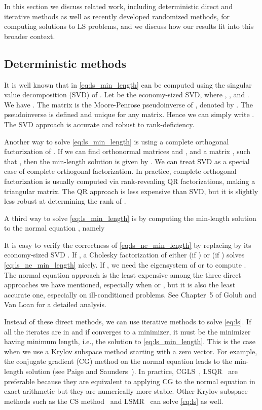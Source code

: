 \documentclass{siamltex}
\begin{document}
In this section we discuss related work, including deterministic direct and
iterative methods as well as recently developed randomized methods, for
computing solutions to LS problems, and we discuss how our results fit into this
broader context.

\subsection{Deterministic methods}
\label{sec:deter-method}

It is well known that  in \eqref{eq:ls_min_length} can be computed using
the singular value decomposition (SVD) of . Let  be the
economy-sized SVD, where , , and . We have .  The matrix  is the Moore-Penrose
pseudoinverse of , denoted by . The pseudoinverse is defined and
unique for any matrix. Hence we can simply write . The SVD
approach is accurate and robust to rank-deficiency.

Another way to solve \eqref{eq:ls_min_length} is using a complete orthogonal
factorization of . If we can find orthonormal matrices  and , and a matrix , such that , then the min-length solution
is given by . We can treat SVD as a special case of
complete orthogonal factorization. In practice, complete orthogonal
factorization is usually computed via rank-revealing QR factorizations, making
 a triangular matrix. The QR approach is less expensive than SVD, but it is
slightly less robust at determining the rank of .

A third way to solve \eqref{eq:ls_min_length} is by computing the min-length
solution to the normal equation , namely

It is easy to verify the correctness of \eqref{eq:ls_ne_min_length} by replacing
 by its economy-sized SVD . If , a Cholesky
factorization of either  (if ) or  (if ) solves
\eqref{eq:ls_ne_min_length} nicely. If , we need the eigensystem
of  or  to compute .  The normal equation approach is the
least expensive among the three direct approaches we have mentioned, especially
when  or , but it is also the least accurate one, especially
on ill-conditioned problems.  See Chapter~5 of Golub and Van Loan
\cite{golub1996matrix} for a detailed analysis.

Instead of these direct methods, we can use iterative methods to solve
\eqref{eq:ls}.  If all the iterates  are in 
and if  converges to a minimizer, it must be the minimizer having
minimum length, i.e., the solution to \eqref{eq:ls_min_length}.  This is the
case when we use a Krylov subspace method starting with a zero vector.  For
example, the conjugate gradient (CG) method on the normal equation leads to the
min-length solution (see Paige and Saunders~\cite{paige1975solution}).  In
practice, CGLS~\cite{hestenesmethods}, LSQR~\cite{paige1982lsqr} are preferable
because they are equivalent to applying CG to the normal equation in exact
arithmetic but they are numerically more stable. Other Krylov subspace methods
such as the CS method~\cite{golub1961chebyshev}
and LSMR~\cite{fong2011lsmr} can solve \eqref{eq:ls} as well.
\end{document}

